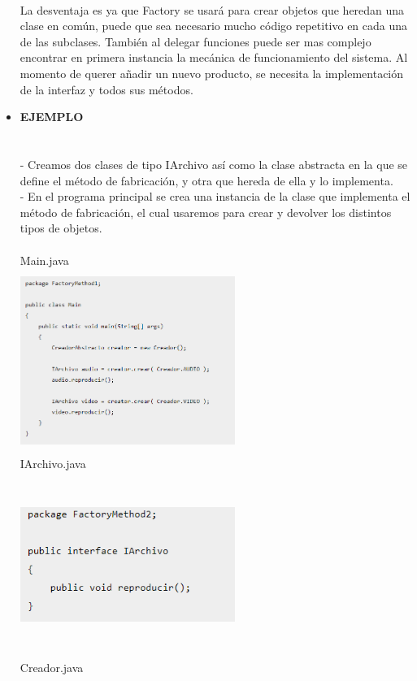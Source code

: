 \documentclass[twoside,twocolumn]{article}
\begin{document}
\begin{itemize}
\\ La desventaja es ya que Factory se usará para crear objetos que heredan una clase en común, puede que sea necesario mucho código repetitivo en cada una de las subclases.
También al delegar funciones puede ser mas complejo encontrar en primera instancia la mecánica de funcionamiento del sistema. 
Al momento de querer añadir un nuevo producto, se necesita la implementación de la interfaz y todos sus métodos.
\\\item  \textbf{EJEMPLO}
\\
\\
\\- Creamos dos clases de tipo IArchivo así como la clase abstracta en la que se define el método de fabricación, y otra que hereda de ella y lo implementa.
\\- En el programa principal se crea una instancia de la clase que implementa el método de fabricación, el cual usaremos para crear y devolver los distintos tipos de objetos.
\\  
\\Main.java
\\\includegraphics[width=7cm, height=6cm]{imagenes/Cod.png}
\\IArchivo.java
\\\includegraphics[width=7cm, height=6cm]{imagenes/cod2.png}
\\Creador.java 

\end{itemize}
\end{document}
